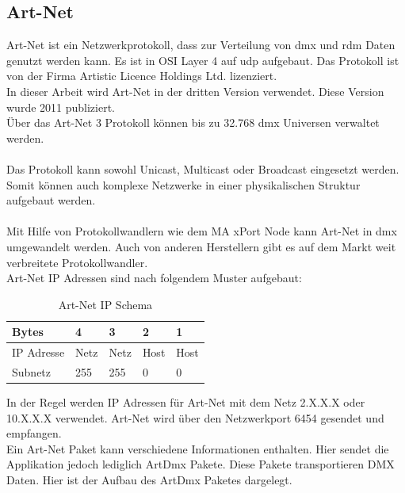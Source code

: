 \documentclass[11pt]{scrartcl}
\begin{document}
\subsection{Art-Net}
Art-Net ist ein Netzwerkprotokoll, dass zur Verteilung von \ac{dmx} und \ac{rdm} Daten genutzt werden kann.
Es ist in OSI Layer 4 auf \ac{udp} aufgebaut. Das Protokoll ist von der Firma Artistic Licence Holdings Ltd. lizenziert.\\
In dieser Arbeit wird Art-Net in der dritten Version verwendet. Diese Version wurde 2011 publiziert.\\
Über das Art-Net 3 Protokoll können bis zu 32.768 \ac{dmx} Universen verwaltet werden.\\
\cite{artnet}\\
Das Protokoll kann sowohl Unicast, Multicast oder Broadcast eingesetzt werden. Somit können auch komplexe Netzwerke
in einer physikalischen Struktur aufgebaut werden.\\
\\
Mit Hilfe von Protokollwandlern wie dem MA xPort Node kann Art-Net in \ac{dmx} umgewandelt werden. Auch von anderen
Herstellern gibt es auf dem Markt weit verbreitete Protokollwandler.\\
Art-Net IP Adressen sind nach folgendem Muster aufgebaut:
\begin{table}[H]
    \begin{tabularx}{\textwidth}{|X|X|X|X|X|}
        \hline Bytes & 4 & 3 & 2 & 1\\\hline
        IP Adresse & Netz & Netz & Host & Host\\\hline
        Subnetz & 255 & 255 & 0 & 0\\\hline
    \end{tabularx}
    \caption{Art-Net IP Schema}
\end{table}
\noindent
In der Regel werden IP Adressen für Art-Net mit dem Netz 2.X.X.X oder 10.X.X.X verwendet. Art-Net wird über den
Netzwerkport 6454 gesendet und empfangen.\\
Ein Art-Net Paket kann verschiedene Informationen enthalten. Hier sendet die Applikation jedoch
lediglich ArtDmx Pakete. Diese Pakete transportieren DMX Daten. Hier ist der Aufbau des ArtDmx Paketes dargelegt.
\end{document}
